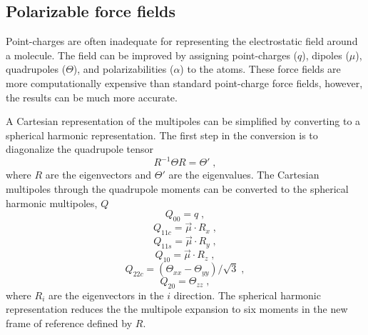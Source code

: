 \documentclass[12pt]{report}
\begin{document}
\subsection{Polarizable force fields}

Point-charges are often inadequate for representing the electrostatic field
around a molecule. The field can be improved by assigning point-charges ($q$),
dipoles ($\mu$), quadrupoles ($\Theta$), and polarizabilities ($\alpha$) to
the atoms. These force fields are more computationally expensive than standard
point-charge force fields, however, the results can be much more accurate.

A Cartesian representation of the multipoles can be simplified by converting
to a spherical harmonic representation. The first step in the conversion is to
diagonalize the quadrupole tensor
\begin{equation}
 R^{-1}\Theta R = \Theta' \; ,
\end{equation}
where $R$ are the eigenvectors and $\Theta'$ are the eigenvalues. The
Cartesian multipoles through the quadrupole moments can be converted to the
spherical harmonic multipoles, $Q$
\begin{equation}
 Q_{00} = q \; ,
\end{equation}
\begin{equation}
 Q_{11c} = \vec \mu \cdot R_x \; ,
\end{equation}
\begin{equation}
 Q_{11s} = \vec \mu \cdot R_y \; ,
\end{equation}
\begin{equation}
 Q_{10} = \vec \mu \cdot R_z \; ,
\end{equation}
\begin{equation}
 Q_{22c} = (\Theta_{xx}-\Theta_{yy})/\sqrt{3} \; ,
\end{equation}
\begin{equation}
 Q_{20} = \Theta_{zz} \; ,
\end{equation}
where $R_i$ are the eigenvectors in the $i$ direction. The spherical harmonic
representation reduces the the multipole expansion to six moments in the new
frame of reference defined by $R$. \cite{} \\
\end{document}
